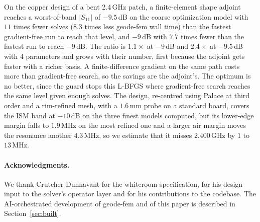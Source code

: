 \documentclass{anvil-paper}
\begin{document}
On the copper design of a bent 2.4\,GHz patch, a finite-element shape
adjoint reaches a worst-of-band $|S_{11}|$ of $-9.5$\,dB on the coarse
optimization model with $11$ times fewer solves ($8.3$ times less geode-fem
wall time) than the fastest gradient-free run to reach that level, and
$-9$\,dB with $7.7$ times fewer than the fastest run to reach $-9$\,dB. The
ratio is $1.1\times$ at $-9$\,dB and $2.4\times$ at $-9.5$\,dB with 4
parameters and grows with their number, first because the adjoint gets
faster with a richer basis. A finite-difference gradient on the same path
costs more than gradient-free search, so the savings are the adjoint's. The
optimum is no better, since the guard stops this L-BFGS where gradient-free
search reaches the same level given enough solves. The design, re-centred
using Palace at third order and a rim-refined mesh, with a $1.6$\,mm probe on
a standard board, covers the ISM band at $-10$\,dB on the three finest models
computed, but its lower-edge margin falls to $1.9$\,MHz on the most refined
one and a larger air margin moves the resonance another $4.3$\,MHz, so we
estimate that it misses $2.400$\,GHz by $1$ to $13$\,MHz.

\paragraph{Acknowledgments.}
We thank Crutcher Dunnavant for the whiteroom specification, for his
design input to the solver's operator layer and for his contributions to
the codebase. The AI-orchestrated development of geode-fem and of this
paper is described in Section~\ref{sec:built}.



\end{document}
